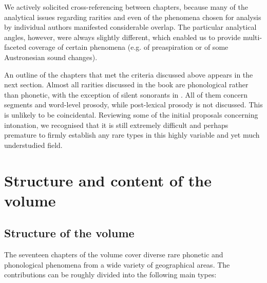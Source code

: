 \documentclass[output=paper]{langscibook}
\begin{document}
We actively solicited cross-referencing between chapters, because many of the analytical issues regarding rarities and even of the phenomena chosen for analysis by individual authors manifested considerable overlap. The particular analytical angles, however, were always slightly different, which enabled us to provide multi-faceted coverage of certain phenomena (e.g. of preaspiration or of some Austronesian sound changes).

An outline of the chapters that met the criteria discussed above appears in the next section. Almost all rarities discussed in the book are phonological rather than phonetic, with the exception of silent sonorants in . All of them concern segments and word-level prosody, while post-lexical prosody is not discussed. This is unlikely to be coincidental. Reviewing some of the initial proposals concerning intonation, we recognised that it is still extremely difficult and perhaps premature to firmly establish any rare types in this highly variable and yet much understudied field.

\section{Structure and content of the volume}
\label{sec:Structure-Content-Volume}
\subsection{Structure of the volume}
\label{sec:Structure-Volume}
The seventeen chapters of the volume cover diverse rare phonetic and phonological phenomena from a wide variety of geographical areas. The contributions can be roughly divided into the following main types: 
\end{document}
